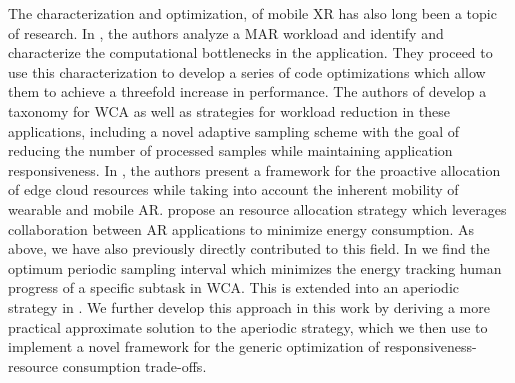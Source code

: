 The characterization and optimization, of mobile \ac{XR} has also long been a topic of research.
In \textcite{srinivasan2009performance}, the authors analyze a \ac{MAR} workload and identify and characterize the computational bottlenecks in the application.
They proceed to use this characterization to develop a series of code optimizations which allow them to achieve a threefold increase in performance.
The authors of \textcite{Wang2019Towards} develop a taxonomy for \ac{WCA} as well as strategies for workload reduction in these applications, including a novel adaptive sampling scheme with the goal of reducing the number of processed samples while maintaining application responsiveness.
In \textcite{huang2021proactive}, the authors present a framework for the proactive allocation of edge cloud resources while taking into account the inherent mobility of wearable and mobile \ac{AR}.
\textcite{al2017energy} propose an resource allocation strategy which leverages collaboration between \ac{AR} applications to minimize energy consumption.
As above, we have also previously directly contributed to this field.
In \textcite{Moothedath2021EnergyOptimal,Moothedath2022EnergyEfficient} we find the optimum periodic sampling interval which minimizes the energy tracking human progress of a specific subtask in \ac{WCA}.
This is extended into an aperiodic strategy in \textcite{Moothedath2022Aperiodic}.
We further develop this approach in this work by deriving a more practical approximate solution to the aperiodic strategy, which we then use to implement a novel framework for the generic optimization of responsiveness-resource consumption trade-offs.